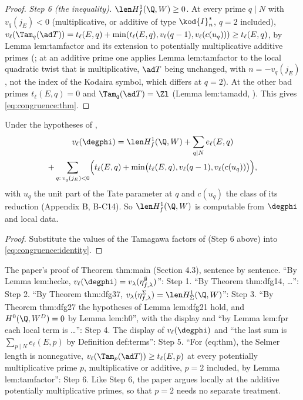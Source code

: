 \begin{proof}
\emph{Step 6 (the inequality).} $\len H^1_f(\Q,W)\ge0$. At every prime $q\mid N$ with $v_q(j_E)<0$ (multiplicative, or additive of type $\kod{I}_n^*$, $q=2$ included),
$v_\ell(\Tam_q(\ad T))=t_\ell(E,q)+\min(t_\ell(E,q),v_\ell(q-1),v_\ell(c(u_q)))\ge t_\ell(E,q)$, by Lemma lem:tamfactor and its extension to potentially multiplicative additive primes
(; at an additive prime one applies Lemma lem:tamfactor to the local quadratic twist that is multiplicative, $\ad T$ being unchanged, with $n=-v_q(j_E)$, not the
index of the Kodaira symbol, which differs at $q=2$). At the other bad primes $t_\ell(E,q)=0$ and $\Tam_q(\ad T)=\Zl$ (Lemma lem:tamadd, ). This gives \eqref{eq:congruence:thm}.
\end{proof}

\begin{corollary}\label{cor:congruence:explicit}
Under the hypotheses of ,
\begin{multline*}
v_\ell(\degphi)=\len H^1_f(\Q,W)+\sum_{q\mid N}e_\ell(E,q)\\
+\sum_{q:\,v_q(j_E)<0}\Bigl(t_\ell(E,q)+\min\bigl(t_\ell(E,q),v_\ell(q-1),v_\ell(c(u_q))\bigr)\Bigr),
\end{multline*}
with $u_q$ the unit part of the Tate parameter at $q$ and $c(u_q)$ the class of its reduction (Appendix B, B-C14). So $\len H^1_f(\Q,W)$ is computable from $\degphi$ and local data.
\end{corollary}

\begin{proof}
Substitute the values of the Tamagawa factors of  (Step 6 above) into \eqref{eq:congruence:identity}.
\end{proof}

\begin{paperlink}
The paper's proof of Theorem thm:main (Section 4.3), sentence by sentence. ``By Lemma lem:hecke, $v_\ell(\degphi)=v_\lambda(\eta^\emptyset_{f,\lambda})$'': Step 1. ``By Theorem thm:dfg14, \dots'': Step 2.
``By Theorem thm:dfg37, $v_\lambda(\eta^\Sigma_{f,\lambda})=\len H^1_\Sigma(\Q,W)$'': Step 3. ``By Theorem thm:dfg27 the hypotheses of Lemma lem:dfg21 hold, and $H^0(\Q,W^D)=0$ by Lemma lem:h0'', with
the display and ``by Lemma lem:fpr each local term is \dots'': Step 4. The display of $v_\ell(\degphi)$ and ``the last sum is $\sum_{p\mid N}e_\ell(E,p)$ by Definition def:terms'': Step 5. ``For
(eq:thm), the Selmer length is nonnegative, $v_\ell(\Tam_p(\ad T))\ge t_\ell(E,p)$ at every potentially multiplicative prime $p$, multiplicative or additive, $p=2$ included, by Lemma
lem:tamfactor'': Step 6. Like Step 6, the paper argues locally at the additive potentially multiplicative primes, so that $p=2$ needs no separate treatment.
\end{paperlink}

